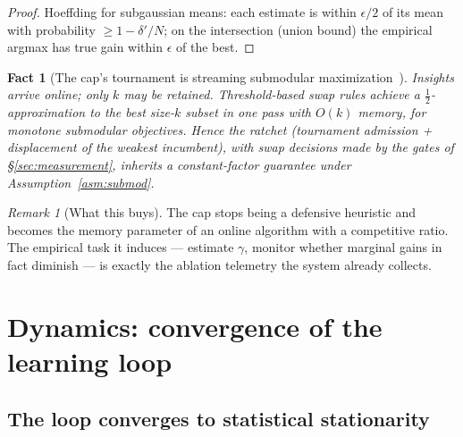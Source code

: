 \documentclass[11pt]{article}
\theoremstyle{plain}
\newtheorem{fact}[theorem]{Fact} %
\theoremstyle{definition}
\theoremstyle{remark}
\newtheorem{remark}[theorem]{Remark}
\begin{document}
\begin{proof}
Hoeffding for subgaussian means: each estimate is within $\epsilon/2$ of its
mean with probability $\ge 1 - \delta'/N$; on the intersection (union bound)
the empirical argmax has true gain within $\epsilon$ of the best.
\end{proof}

\begin{fact}[The cap's tournament is streaming submodular maximization~\cite{badan14}]
\label{fact:streaming}
Insights arrive online; only $k$ may be retained. Threshold-based
swap rules achieve a $\tfrac12$-approximation to the best size-$k$ subset in
one pass with $O(k)$ memory, for monotone submodular objectives. Hence the
ratchet (tournament admission + displacement of the weakest incumbent), with
swap decisions made by the gates of \S\ref{sec:measurement}, inherits a
constant-factor guarantee under Assumption~\ref{asm:submod}.
\end{fact}

\begin{remark}[What this buys]
The cap stops being a defensive heuristic and becomes the memory parameter of
an online algorithm with a competitive ratio. The empirical task it induces
--- estimate $\gamma$, monitor whether marginal gains in fact diminish --- is
exactly the ablation telemetry the system already collects.
\end{remark}

\section{Dynamics: convergence of the learning loop}\label{sec:dynamics}

\subsection{The loop converges to statistical stationarity}
\end{document}
